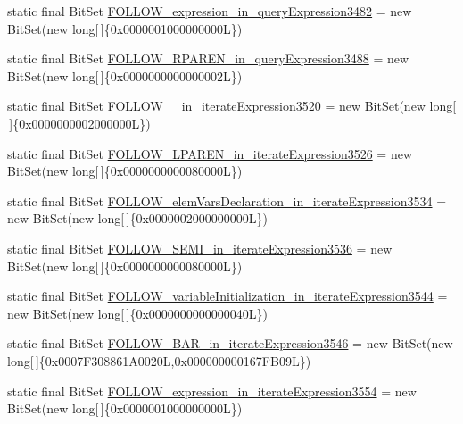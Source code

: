\begin{DoxyCompactItemize}
static final Bit\-Set \hyperlink{classorg_1_1tzi_1_1use_1_1parser_1_1soil_1_1_soil_parser_a023055fa273b69fba3e71505a0c8e33c}{F\-O\-L\-L\-O\-W\-\_\-expression\-\_\-in\-\_\-query\-Expression3482} = new Bit\-Set(new long\mbox{[}$\,$\mbox{]}\{0x0000001000000000\-L\})
\item 
static final Bit\-Set \hyperlink{classorg_1_1tzi_1_1use_1_1parser_1_1soil_1_1_soil_parser_a2f911f5fb27a999db5834d6b43c86dfd}{F\-O\-L\-L\-O\-W\-\_\-\-R\-P\-A\-R\-E\-N\-\_\-in\-\_\-query\-Expression3488} = new Bit\-Set(new long\mbox{[}$\,$\mbox{]}\{0x0000000000000002\-L\})
\item 
static final Bit\-Set \hyperlink{classorg_1_1tzi_1_1use_1_1parser_1_1soil_1_1_soil_parser_a3bb7122766587373149243d6b1aff74f}{F\-O\-L\-L\-O\-W\-\_\-\_\-in\-\_\-iterate\-Expression3520} = new Bit\-Set(new long\mbox{[}$\,$\mbox{]}\{0x0000000002000000\-L\})
\item 
static final Bit\-Set \hyperlink{classorg_1_1tzi_1_1use_1_1parser_1_1soil_1_1_soil_parser_ab8b3c657a90aec5b1c467a770620a619}{F\-O\-L\-L\-O\-W\-\_\-\-L\-P\-A\-R\-E\-N\-\_\-in\-\_\-iterate\-Expression3526} = new Bit\-Set(new long\mbox{[}$\,$\mbox{]}\{0x0000000000080000\-L\})
\item 
static final Bit\-Set \hyperlink{classorg_1_1tzi_1_1use_1_1parser_1_1soil_1_1_soil_parser_aa51418f321ff8e9e82709aa0f00263d6}{F\-O\-L\-L\-O\-W\-\_\-elem\-Vars\-Declaration\-\_\-in\-\_\-iterate\-Expression3534} = new Bit\-Set(new long\mbox{[}$\,$\mbox{]}\{0x0000002000000000\-L\})
\item 
static final Bit\-Set \hyperlink{classorg_1_1tzi_1_1use_1_1parser_1_1soil_1_1_soil_parser_a4a5faeb28f33b742200e6a73dac5ffb2}{F\-O\-L\-L\-O\-W\-\_\-\-S\-E\-M\-I\-\_\-in\-\_\-iterate\-Expression3536} = new Bit\-Set(new long\mbox{[}$\,$\mbox{]}\{0x0000000000080000\-L\})
\item 
static final Bit\-Set \hyperlink{classorg_1_1tzi_1_1use_1_1parser_1_1soil_1_1_soil_parser_a769d9d3ac876a5efbe149329f3793b9c}{F\-O\-L\-L\-O\-W\-\_\-variable\-Initialization\-\_\-in\-\_\-iterate\-Expression3544} = new Bit\-Set(new long\mbox{[}$\,$\mbox{]}\{0x0000000000000040\-L\})
\item 
static final Bit\-Set \hyperlink{classorg_1_1tzi_1_1use_1_1parser_1_1soil_1_1_soil_parser_a633150ccbaf0bafb6e57bdab77a46548}{F\-O\-L\-L\-O\-W\-\_\-\-B\-A\-R\-\_\-in\-\_\-iterate\-Expression3546} = new Bit\-Set(new long\mbox{[}$\,$\mbox{]}\{0x0007\-F308861\-A0020\-L,0x000000000167\-F\-B09\-L\})
\item 
static final Bit\-Set \hyperlink{classorg_1_1tzi_1_1use_1_1parser_1_1soil_1_1_soil_parser_ab5349cc8259ca3ade5dbf29f836d34df}{F\-O\-L\-L\-O\-W\-\_\-expression\-\_\-in\-\_\-iterate\-Expression3554} = new Bit\-Set(new long\mbox{[}$\,$\mbox{]}\{0x0000001000000000\-L\})

\end{DoxyCompactItemize}
